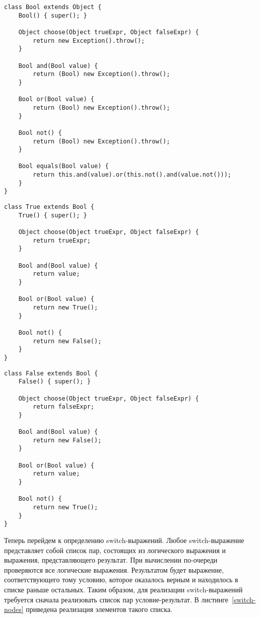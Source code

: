 \begin{lstlisting}[float,label=bool-base,caption=Определение базового класса логического типа данных.]
class Bool extends Object {
    Bool() { super(); }

    Object choose(Object trueExpr, Object falseExpr) {
        return new Exception().throw();
    }

    Bool and(Bool value) {
        return (Bool) new Exception().throw();
    }

    Bool or(Bool value) {
        return (Bool) new Exception().throw();
    }

    Bool not() {
        return (Bool) new Exception().throw();
    }

    Bool equals(Bool value) {
        return this.and(value).or(this.not().and(value.not()));
    }
}
\end{lstlisting}
\begin{lstlisting}[float,label=bool-true,caption=Определение класса True.]
class True extends Bool {
    True() { super(); }

    Object choose(Object trueExpr, Object falseExpr) {
        return trueExpr;
    }

    Bool and(Bool value) {
        return value;
    }

    Bool or(Bool value) {
        return new True();
    }

    Bool not() {
        return new False();
    }
}
\end{lstlisting}
\begin{lstlisting}[float,label=bool-false,caption=Определение класса False.]
class False extends Bool {
    False() { super(); }

    Object choose(Object trueExpr, Object falseExpr) {
        return falseExpr;
    }

    Bool and(Bool value) {
        return new False();
    }

    Bool or(Bool value) {
        return value;
    }

    Bool not() {
        return new True();
    }
}
\end{lstlisting}
Теперь перейдем к определению switch-выражений. Любое switch-выражение представляет собой список пар, состоящих из логического выражения и выражения, представляющего результат.
При вычислении по-очереди проверяются все логические выражения. Результатом будет выражение, соответствующего тому условию, которое оказалось верным и находилось в списке раньше остальных.
Таким образом, для реализации switch-выражений требуется сначала реализовать список пар условие-результат. В листинге~\ref{switch-nodes} приведена реализация элементов такого списка.
